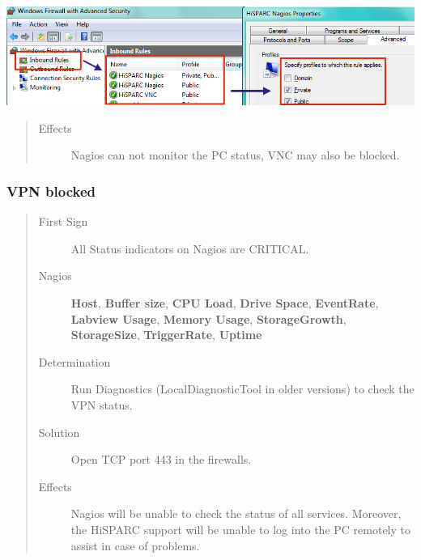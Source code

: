 \documentclass[a4paper,11pt,english]{sphinxmanual}
\begin{document}
{\hfill\includegraphics{firewall_rules.png}\hfill}
\begin{quote}\begin{description}
\item[{Effects}] \leavevmode
Nagios can not monitor the PC status, VNC may also be blocked.

\end{description}\end{quote}


\subsubsection{VPN blocked}
\label{known-issues:vpn-blocked}\begin{quote}\begin{description}
\item[{First Sign}] \leavevmode
All Status indicators on Nagios are CRITICAL.

\item[{Nagios}] \leavevmode
\textbf{Host}, \textbf{Buffer size}, \textbf{CPU Load}, \textbf{Drive Space},
\textbf{EventRate}, \textbf{Labview Usage}, \textbf{Memory Usage},
\textbf{StorageGrowth}, \textbf{StorageSize}, \textbf{TriggerRate}, \textbf{Uptime}

\item[{Determination}] \leavevmode
Run Diagnostics (LocalDiagnosticTool in older versions)
to check the VPN status.

\item[{Solution}] \leavevmode
Open TCP port 443 in the firewalls.

\item[{Effects}] \leavevmode
Nagios will be unable to check the status of all services.
Moreover, the HiSPARC support will be unable to log into the
PC remotely to assist in case of problems.

\end{description}\end{quote}
\end{document}

